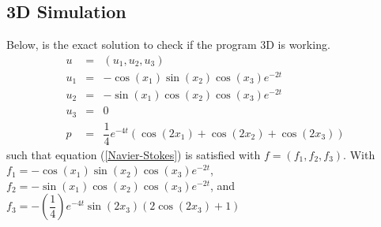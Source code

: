\documentclass[a4paper,10pt]{article}
\begin{document}
%
%
%
%
%
%
%
%
%
%

\newpage
\subsection{ 3D Simulation}
Below, is the exact solution to check if the program 3D is working.
\begin{eqnarray}\nonumber
u &=& (u_{1},u_{2},u_{3}) \\ \nonumber
u_{1} &=& -\cos(x_{1}) \sin(x_{2}) \cos(x_3) e^{-2t}\\ \nonumber
u_{2} &=& -\sin(x_{1}) \cos(x_{2}) \cos(x_3) e^{-2t}\\ \nonumber
u_{3} &=& 0 \\ \nonumber
p&=& \dfrac{1}{4} e^{-4t} (\cos(2x_1)+\cos(2x_2)+\cos(2x_3))
\end{eqnarray}
such that equation (\ref{Navier-Stokes}) is satisfied with $ f = (f_{1},f_{2},f_3) $. With $ f_{1} = -\cos(x_1) \sin(x_2) \cos(x_3) e^{-2t} $, $ f_{2} = -\sin(x_1) \cos(x_2) \cos(x_3) e^{-2t}  $, and $ f_{3} = -(\dfrac{1}{4})e^{-4t}\sin(2x_3)(2\cos(2x_3)+1)   $
\end{document}
